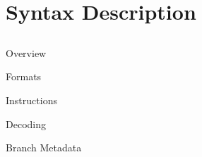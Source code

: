\section{Syntax Description}
\subsection{}

\begin{frame}{Overview}
\end{frame}

\begin{frame}{Formats}
\end{frame}

\begin{frame}{Instructions}
\end{frame}

\begin{frame}{Decoding}
\end{frame}

\begin{frame}{Branch Metadata}
\end{frame}
